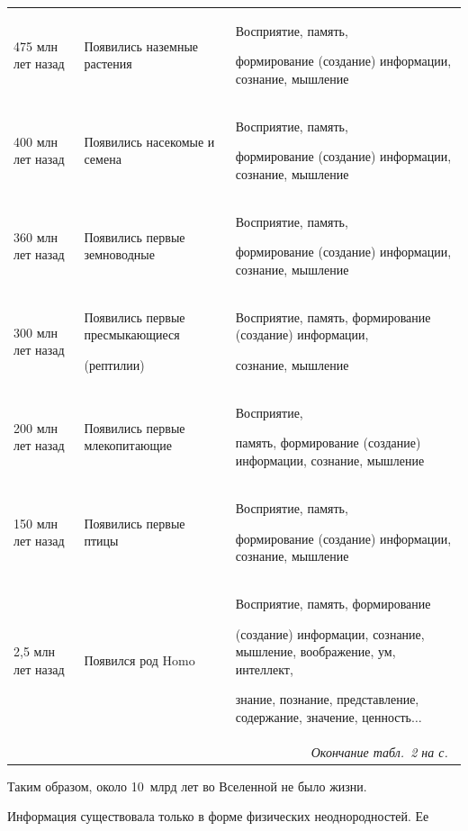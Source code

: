 \begin{table}
\begin{center}
\begin{tabular}{|p{20mm}|p{42.5mm}|p{55mm}|}
475 млн лет назад&Появились наземные растения&Восприятие, память, 


формирование (создание) информации, сознание, мышление\\


400 млн лет назад&Появились насекомые и семена &Восприятие, память, 


формирование (создание) информации, сознание, мышление\\


360 млн лет назад&Появились первые земноводные&Восприятие, память, 


формирование (создание) информации, сознание, мышление\\


300 млн лет назад&Появились первые пресмыкающиеся 


(рептилии)&Восприятие, память, формирование (создание) информации, 


сознание, мышление \\


200 млн лет назад&Появились первые млекопитающие&Восприятие, 


память, формирование (создание) информации, сознание, мышление\\


150 млн лет назад&Появились первые птицы&Восприятие, память, 


формирование (создание) информации, сознание, мышление\\


2,5 млн лет назад&Появился род Homo&Восприятие, память, формирование 


(создание) информации, сознание, мышление, воображение, ум, интеллект, 


знание, познание, представление, содержание, значение, ценность$\ldots$\\


\hline\multicolumn{3}{r}{\textit{Окончание табл.~2 на с.~\pageref{s2}}}


\end{tabular}


\end{center}


\end{table}





   


   Таким образом, около 10~млрд лет во Вселенной не было жизни. 


Информация существовала только в форме физических неоднородностей. Ее 


